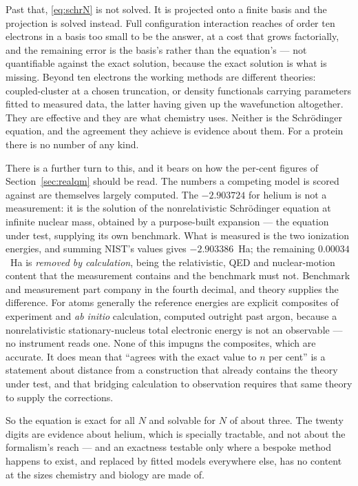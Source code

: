 \documentclass[11pt]{article}
\begin{document}
Past that, \eqref{eq:schrN} is not solved. It is projected onto a finite basis and the projection
is solved instead. Full configuration interaction reaches of order ten electrons in a basis too
small to be the answer, at a cost that grows factorially, and the remaining error is the basis's
rather than the equation's --- not quantifiable against the exact solution, because the exact
solution is what is missing. Beyond ten electrons the working methods are different theories:
coupled-cluster at a chosen truncation, or density functionals carrying parameters fitted to
measured data, the latter having given up the wavefunction altogether. They are effective and they
are what chemistry uses. Neither is the Schr\"odinger equation, and the agreement they achieve is
evidence about them. For a protein there is no number of any kind.

There is a further turn to this, and it bears on how the per-cent figures of
Section~\ref{sec:realqm} should be read. The numbers a competing model is scored against are
themselves largely computed. The $-2.903724$ for helium is not a measurement: it is the solution of
the nonrelativistic Schr\"odinger equation at infinite nuclear mass, obtained by a purpose-built
expansion --- the equation under test, supplying its own benchmark. What is measured is the two
ionization energies, and summing NIST's values gives $-2.903386$~Ha; the remaining $0.00034$~Ha is
\emph{removed by calculation}, being the relativistic, QED and nuclear-motion content that the
measurement contains and the benchmark must not. Benchmark and measurement part company in the
fourth decimal, and theory supplies the difference. For atoms generally the reference energies are
explicit composites of experiment and \emph{ab initio} calculation, computed outright past argon,
because a nonrelativistic stationary-nucleus total electronic energy is not an observable --- no
instrument reads one. None of this impugns the composites, which are accurate. It does mean that
``agrees with the exact value to $n$ per cent'' is a statement about distance from a construction
that already contains the theory under test, and that bridging calculation to observation requires
that same theory to supply the corrections.

So the equation is exact for all $N$ and solvable for $N$ of about three. The twenty digits are
evidence about helium, which is specially tractable, and not about the formalism's reach --- and an
exactness testable only where a bespoke method happens to exist, and replaced by fitted models
everywhere else, has no content at the sizes chemistry and biology are made of.
\end{document}
